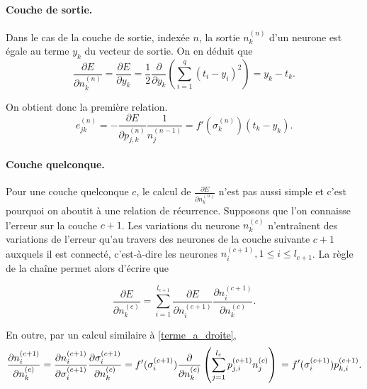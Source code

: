 \documentclass[12pt]{article}
\newcommand{\lc}[1]{l_{#1}}
\newcommand{\neurone}[2]{n_{ #1 }^{ (#2) }}
\newcommand{\poids}[3]{p_{#1,#2}^{ (#3) }}
\newcommand{\nps}[2]{\sigma_{ #1 }^{ (#2) }} %
\newcommand{\err}[3]{e_{ #1 #2 }^{ (#3) }}
\begin{document}
		\paragraph{Couche de sortie.} 
		
		Dans le cas de la couche de sortie, indexée $n$, la sortie $\neurone{k}{n}$ d'un neurone est égale au terme $y_k$ du vecteur de sortie. On en déduit que
		\begin{equation*}
			\frac{ \partial E }{ \partial \neurone{k}{n} } 
			= \frac{ \partial E }{ \partial y_k } 
			= \frac{1}{2} \frac{ \partial }{ \partial y_k } \left( \sum_{i=1}^q (t_i - y_i)^2 \right) = y_k - t_k.
		\end{equation*}

		On obtient donc la première relation.
		\begin{equation*}
			\err{j}{k}{n} = - \frac{ \partial E }{ \partial \poids{j}{k}{n} } \frac{1}{ \neurone{j}{n-1} } = f'(\nps{k}{n}) (t_k - y_k).
		\end{equation*}

		\paragraph{Couche quelconque.} 
		
		Pour une couche quelconque $c$, le calcul de $\frac{ \partial E }{ \partial \neurone{k}{n} }$ n'est pas aussi simple et c'est pourquoi on aboutit à une relation de récurrence. Supposons que l'on connaisse l'erreur sur la couche $c+1$. Les variations du neurone $\neurone{k}{c}$ n'entraînent des variations de l'erreur qu'au travers des neurones de la couche suivante $c+1$ auxquels il est connecté, c'est-à-dire les neurones $\neurone{i}{c+1}, 1 \leq i \leq \lc{c+1}$. La règle de la chaîne permet alors d'écrire que

		\begin{equation*}
			\frac{ \partial E }{ \partial \neurone{k}{c} } 
			= \sum_{i=1}^{\lc{c+1}} \frac{ \partial E }{ \partial \neurone{i}{c+1} } \frac{ \partial \neurone{i}{c+1} }{ \partial \neurone{k}{c} }.
		\end{equation*}
		
		En outre, par un calcul similaire à \ref{terme_a_droite},
		\begin{equation*}
			\frac{ \partial \neurone{i}{c+1} }{ \partial \neurone{k}{c} } 
			= \frac{ \partial \neurone{i}{c+1} }{ \partial \nps{i}{c+1} } \frac{ \partial \nps{i}{c+1} }{ \partial \neurone{k}{c} } 
			= f'( \nps{i}{c+1} ) \frac{ \partial }{ \partial \neurone{k}{c} } \left( \sum_{j=1}^{\lc{c}} \poids{j}{i}{c+1} \neurone{j}{c} \right) \\
			= f'( \nps{i}{c+1} )  \poids{k}{i}{c+1}.
		\end{equation*}
		
\end{document}
